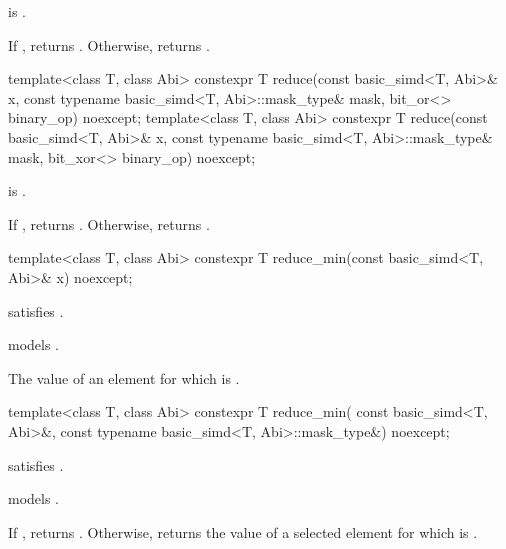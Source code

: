 \begin{itemdescr}
  \pnum\constraints
   is .

  \pnum\returns
  If , returns . Otherwise, returns  \forallmaskedi.
\end{itemdescr}

\begin{itemdecl}
template<class T, class Abi>
  constexpr T reduce(const basic_simd<T, Abi>& x, const typename basic_simd<T, Abi>::mask_type& mask,
                     bit_or<> binary_op) noexcept;
template<class T, class Abi>
  constexpr T reduce(const basic_simd<T, Abi>& x, const typename basic_simd<T, Abi>::mask_type& mask,
                     bit_xor<> binary_op) noexcept;
\end{itemdecl}

\begin{itemdescr}
  \pnum\constraints
   is .

  \pnum\returns
  If , returns . Otherwise, returns  \forallmaskedi.
\end{itemdescr}

\begin{itemdecl}
template<class T, class Abi> constexpr T reduce_min(const basic_simd<T, Abi>& x) noexcept;
\end{itemdecl}

\begin{itemdescr}
  \pnum\constraints
   satisfies .

  \pnum\expects
   models .

  \pnum\returns
  The value of an element  for which  is  \foralli.
\end{itemdescr}

\begin{itemdecl}
template<class T, class Abi>
  constexpr T reduce_min(
    const basic_simd<T, Abi>&, const typename basic_simd<T, Abi>::mask_type&) noexcept;
\end{itemdecl}

\begin{itemdescr}
  \pnum\constraints
   satisfies .

  \pnum\expects
   models .

  \pnum\returns
  If , returns .
  Otherwise, returns the value of a selected element  for which  is  \forallmaskedi.
\end{itemdescr}

